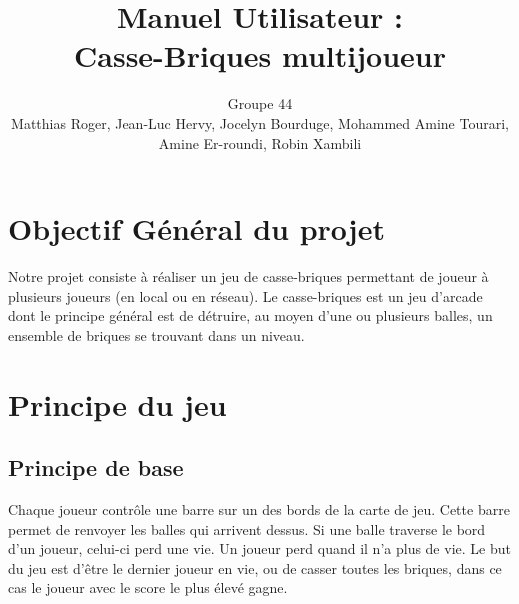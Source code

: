 \documentclass[12pt]{article}
\title{Manuel Utilisateur :\\Casse-Briques multijoueur}
\author{Groupe 44 \\ Matthias Roger, Jean-Luc Hervy, Jocelyn Bourduge, Mohammed Amine Tourari,\\ Amine Er-roundi, Robin Xambili}
\date{}
\begin{document}
\begin{titlepage}
    \maketitle
    \thispagestyle{empty}
    \tableofcontents
\end{titlepage} 


\section{Objectif Général du projet}
	Notre projet consiste à réaliser un jeu de casse-briques permettant de joueur à plusieurs joueurs (en local ou en réseau). Le casse-briques est un jeu d'arcade dont le principe général est de détruire, au moyen d'une ou plusieurs balles, un ensemble de briques se trouvant dans un niveau.


\section{Principe du jeu}
	\subsection{Principe de base}
	Chaque joueur contrôle une barre sur un des bords de la carte de jeu. Cette barre permet de renvoyer les balles qui arrivent dessus. Si une balle traverse le bord d'un joueur, celui-ci perd une vie. Un joueur perd quand il n'a plus de vie. Le but du jeu est d'être le dernier joueur en vie, ou de casser toutes les briques, dans ce cas le joueur avec le score le plus élevé gagne.
	
\end{document}
